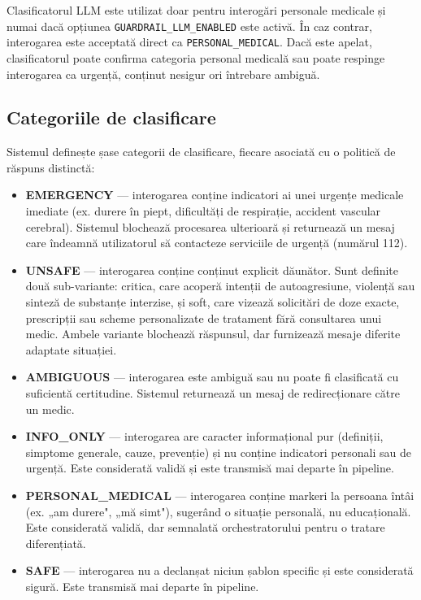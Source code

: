 \documentclass[12pt, a4paper, oneside, romanian]{teza-upb}
\begin{document}
Clasificatorul LLM este utilizat doar pentru interogări personale medicale și numai dacă opțiunea \texttt{GUARDRAIL\_LLM\_ENABLED} este activă. În caz contrar, interogarea este acceptată direct ca \texttt{PERSONAL\_MEDICAL}. Dacă este apelat, clasificatorul poate confirma categoria personal medicală sau poate respinge interogarea ca urgență, conținut nesigur ori întrebare ambiguă.


\subsection{Categoriile de clasificare}

Sistemul definește șase categorii de clasificare, fiecare asociată cu o politică de răspuns distinctă:

\begin{itemize}
    \item \textbf{EMERGENCY} — interogarea conține indicatori ai unei urgențe medicale imediate (ex. durere în piept, dificultăți de respirație, accident vascular cerebral). Sistemul blochează procesarea ulterioară și returnează un mesaj care îndeamnă utilizatorul să contacteze serviciile de urgență (numărul 112).
    \item \textbf{UNSAFE} — interogarea conține conținut explicit dăunător. Sunt definite două sub-variante: critica, care acoperă intenții de autoagresiune, violență sau sinteză de substanțe interzise, și soft, care vizează solicitări de doze exacte, prescripții sau scheme personalizate de tratament fără consultarea unui medic. Ambele variante blochează răspunsul, dar furnizează mesaje diferite adaptate situației.
    \item \textbf{AMBIGUOUS} — interogarea este ambiguă sau nu poate fi clasificată cu suficientă certitudine. Sistemul returnează un mesaj de redirecționare către un medic.
    \item \textbf{INFO\_ONLY} — interogarea are caracter informațional pur (definiții, simptome generale, cauze, prevenție) și nu conține indicatori personali sau de urgență. Este considerată validă și este transmisă mai departe în pipeline.
    \item \textbf{PERSONAL\_MEDICAL} — interogarea conține markeri la persoana întâi (ex. „am durere", „mă simt"), sugerând o situație personală, nu educațională. Este considerată validă, dar semnalată orchestratorului pentru o tratare diferențiată.
    \item \textbf{SAFE} — interogarea nu a declanșat niciun șablon specific și este considerată sigură. Este transmisă mai departe în pipeline.
\end{itemize}
\end{document}
